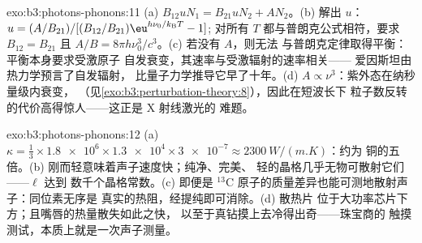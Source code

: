 \begin{solution}{exo:b3:photons-phonons:11}
(a) $B_{12}uN_1 = B_{21}uN_2 + AN_2$。(b) 解出 $u$：
$u = (A/B_{21})/[(B_{12}/B_{21})\eu^{h\nu_0/k_{\text{B}}T} - 1]$;
对所有 $T$ 都与普朗克公式相符，要求 $B_{12} = B_{21}$ 且
$A/B = 8\pi h\nu_0^3/c^3$。(c) 若没有 $A$，则无法
与普朗克定律取得平衡：平衡本身要求受激原子
自发衰变，其速率与受激辐射的速率相关——
爱因斯坦由热力学预言了自发辐射，
比量子力学推导它早了十年。(d) $A \propto
\nu^3$：紫外态在纳秒量级内衰变，
（见\cref{exo:b3:perturbation-theory:8}），因此在短波长下
粒子数反转的代价高得惊人——这正是 X 射线激光的
难题。
\end{solution}

\begin{solution}{exo:b3:photons-phonons:12}
(a) $\kappa = \tfrac13 \times \num{1.8e6} \times \num{1.3e4}
\times \num{3e-7} \approx \qty{2300}{W/(m.K)}$：约为
铜的五倍。(b) 刚而轻意味着声子速度快；纯净、完美、
轻的晶格几乎无物可散射它们——$\ell$ 达到
数千个晶格常数。(c) 即便是
$^{13}$C 原子的质量差异也能可测地散射声子：同位素无序是
真实的热阻，经提纯即可消除。(d) 散热片
位于大功率芯片下方；且嘴唇的热量散失如此之快，
以至于真钻摸上去冷得出奇——珠宝商的
触摸测试，本质上就是一次声子测量。
\end{solution}

